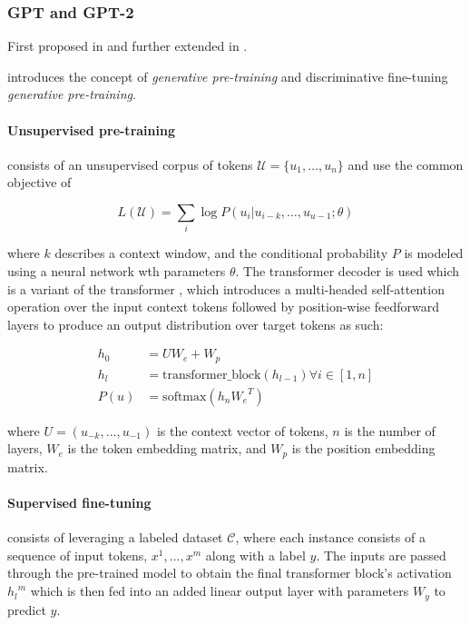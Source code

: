 \documentclass[a4paper,12pt,twoside,openright]{report}
\begin{document}


\subsubsection{GPT and GPT-2}

First proposed in \cite{radford18} and further extended in \cite{radford19}.

\cite{radford18} introduces the concept of \textit{generative pre-training} and discriminative fine-tuning \textit{generative pre-training}.

\paragraph{Unsupervised pre-training} consists of an unsupervised corpus of tokens $\mathcal{U} = \{ u_1, \ldots, u_n \}$ and use the common objective of 

\begin{equation}
L(\mathcal{U}) = \sum_i \log P(u_i | u_{i-k}, \ldots, u_{u-1}; \theta )
\end{equation}

where $k$ describes a context window, and the conditional probability $P$ is modeled using a neural network wth parameters $\theta$. 
The transformer decoder \cite{Liu18} is used which is a variant of the transformer \cite{vaswani17}, which introduces a multi-headed self-attention operation over the input context tokens followed by position-wise feedforward layers to produce an output distribution over target tokens as such:

\begin{align}
h_0 & = UW_e + W_p \\
h_l & = \text{transformer\_block}(h_{l-1}) \forall i \in [1, n] \\
P(u) & = \text{softmax}(h_n {W_e}^T)
\end{align}

where $U=\left(u_{-k}, \ldots, u_{-1}\right)$ is the context vector of tokens, $n$ is the number of layers, $W_e$ is the token embedding matrix, and $W_p$ is the position embedding matrix.

\paragraph{Supervised fine-tuning} consists of leveraging a labeled dataset $\mathcal{C}$, where each instance consists of a sequence of input tokens, $x^1, \ldots, x^m$ along with a label $y$.
The inputs are passed through the pre-trained model to obtain the final transformer block's activation ${h_l}^m$ which is then fed into an added linear output layer with parameters $W_y$ to predict $y$.
\end{document}
